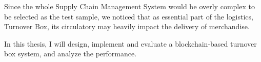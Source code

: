Since the whole Supply Chain Management System would be overly complex to be selected as the test sample, we noticed that as essential part of the logistics, Turnover Box, its circulatory may heavily impact the delivery of merchandise. 

In this thesis, I will design, implement and evaluate a blockchain-based turnover box system, and analyze the performance.